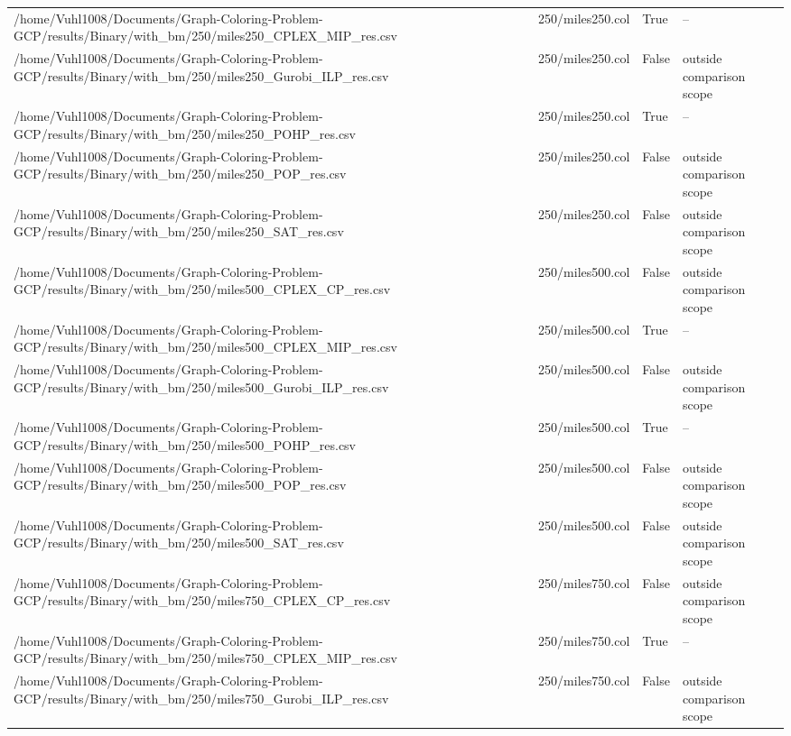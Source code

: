 \begin{table}[htbp]
\begin{tabular}{llll}
/home/Vuhl1008/Documents/Graph-Coloring-Problem-GCP/results/Binary/with\_bm/250/miles250\_CPLEX\_MIP\_res.csv & 250/miles250.col & True & -- \\
/home/Vuhl1008/Documents/Graph-Coloring-Problem-GCP/results/Binary/with\_bm/250/miles250\_Gurobi\_ILP\_res.csv & 250/miles250.col & False & outside comparison scope \\
/home/Vuhl1008/Documents/Graph-Coloring-Problem-GCP/results/Binary/with\_bm/250/miles250\_POHP\_res.csv & 250/miles250.col & True & -- \\
/home/Vuhl1008/Documents/Graph-Coloring-Problem-GCP/results/Binary/with\_bm/250/miles250\_POP\_res.csv & 250/miles250.col & False & outside comparison scope \\
/home/Vuhl1008/Documents/Graph-Coloring-Problem-GCP/results/Binary/with\_bm/250/miles250\_SAT\_res.csv & 250/miles250.col & False & outside comparison scope \\
/home/Vuhl1008/Documents/Graph-Coloring-Problem-GCP/results/Binary/with\_bm/250/miles500\_CPLEX\_CP\_res.csv & 250/miles500.col & False & outside comparison scope \\
/home/Vuhl1008/Documents/Graph-Coloring-Problem-GCP/results/Binary/with\_bm/250/miles500\_CPLEX\_MIP\_res.csv & 250/miles500.col & True & -- \\
/home/Vuhl1008/Documents/Graph-Coloring-Problem-GCP/results/Binary/with\_bm/250/miles500\_Gurobi\_ILP\_res.csv & 250/miles500.col & False & outside comparison scope \\
/home/Vuhl1008/Documents/Graph-Coloring-Problem-GCP/results/Binary/with\_bm/250/miles500\_POHP\_res.csv & 250/miles500.col & True & -- \\
/home/Vuhl1008/Documents/Graph-Coloring-Problem-GCP/results/Binary/with\_bm/250/miles500\_POP\_res.csv & 250/miles500.col & False & outside comparison scope \\
/home/Vuhl1008/Documents/Graph-Coloring-Problem-GCP/results/Binary/with\_bm/250/miles500\_SAT\_res.csv & 250/miles500.col & False & outside comparison scope \\
/home/Vuhl1008/Documents/Graph-Coloring-Problem-GCP/results/Binary/with\_bm/250/miles750\_CPLEX\_CP\_res.csv & 250/miles750.col & False & outside comparison scope \\
/home/Vuhl1008/Documents/Graph-Coloring-Problem-GCP/results/Binary/with\_bm/250/miles750\_CPLEX\_MIP\_res.csv & 250/miles750.col & True & -- \\
/home/Vuhl1008/Documents/Graph-Coloring-Problem-GCP/results/Binary/with\_bm/250/miles750\_Gurobi\_ILP\_res.csv & 250/miles750.col & False & outside comparison scope \\

\end{tabular}
\end{table}
